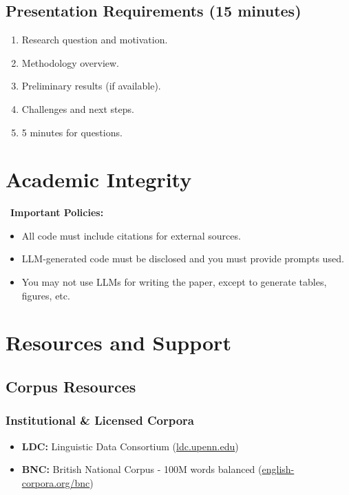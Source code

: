 \documentclass[10pt,letterpaper]{article}
\begin{document}
\subsection{Presentation Requirements (15 minutes)}
\begin{enumerate}
  \item Research question and motivation.
  \item Methodology overview.
  \item Preliminary results (if available).
  \item Challenges and next steps.
  \item 5 minutes for questions.
\end{enumerate}

\section{Academic Integrity}

\begin{redbox}
\faExclamationTriangle\ \textbf{Important Policies:}
\begin{itemize}
  \item All code must include citations for external sources.
  \item LLM-generated code must be disclosed and you must provide prompts used.
  \item You may not use LLMs for writing the paper, except to generate tables, figures, etc.
\end{itemize}
\end{redbox}

\section{Resources and Support}

\subsection{Corpus Resources}

\subsubsection{Institutional \& Licensed Corpora}
\begin{itemize}
  \item \textbf{LDC:} Linguistic Data Consortium (\href{https://www.ldc.upenn.edu/}{ldc.upenn.edu})
  \item \textbf{BNC:} British National Corpus - 100M words balanced (\href{https://www.english-corpora.org/bnc/}{english-corpora.org/bnc})
\end{itemize}
\end{document}
